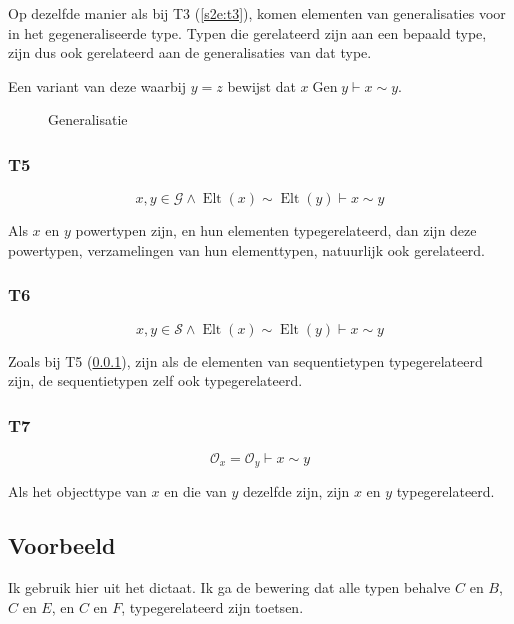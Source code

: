 \documentclass[10pt]{article}
\newcommand{\Gen}{\ensuremath{\operatorname{Gen}}}
\begin{document}
Op dezelfde manier als bij T3 (\ref{s2e:t3}), komen elementen van
generalisaties voor in het gegeneraliseerde type. Typen die gerelateerd zijn aan 
een bepaald type, zijn dus ook gerelateerd aan de generalisaties
van dat type.

Een variant van deze waarbij $y=z$ bewijst dat $x \Gen y \vdash x \sim y$.


\begin{figure}[b]
  \centering
  \caption{Generalisatie}
  \label{fig:generalisatie}
\end{figure}

\subsubsection{T5}
\label{T5}
\[
  x,y \in \mathcal{G} \wedge \operatorname{Elt}(x) \sim 
  \operatorname{Elt}(y) \vdash x \sim y
\]

Als $x$ en $y$ powertypen zijn, en hun elementen typegerelateerd, 
dan zijn deze powertypen, verzamelingen van hun elementtypen,
natuurlijk ook gerelateerd.

\subsubsection{T6}
\[
  x,y \in \mathcal{S} \wedge \operatorname{Elt}(x) \sim 
  \operatorname{Elt}(y) \vdash x \sim y
\]

Zoals bij T5 (\ref{T5}), zijn als de elementen van sequentietypen 
typegerelateerd zijn, de sequentietypen zelf ook typegerelateerd.

\subsubsection{T7}
\[
  \mathcal{O}_x = \mathcal{O}_y \vdash x \sim y
\]

Als het objecttype van $x$ en die van $y$ dezelfde zijn, zijn $x$ en $y$ 
typegerelateerd.

\clearpage

\subsection{Voorbeeld}

Ik gebruik hier \cite[figuur 2.26]{dictaat} uit het dictaat. Ik ga de bewering 
dat alle typen behalve $C$ en $B$, $C$ en $E$, en $C$ en $F$, typegerelateerd
zijn toetsen.
\end{document}
